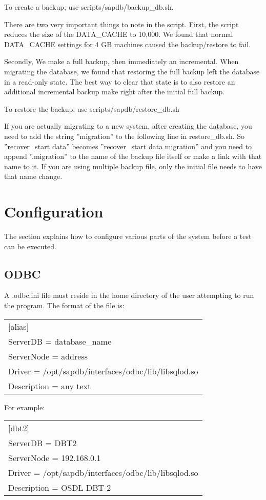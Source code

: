 \documentclass{article}
\begin{document}
To create a backup, use scripts/sapdb/backup\_db.sh.

There are two very important things to note in the script.  First, the script
reduces the size of the DATA\_CACHE to 10,000.   We found that normal
DATA\_CACHE settings for 4 GB machines caused the backup/restore to fail.

Secondly, We make a full backup, then immediately an incremental.  When
migrating the database, we found that restoring the full backup left the
database in a read-only state.  The best way to clear that state is to also
restore an additional incremental backup make right after the initial full
backup.

To restore the backup, use scripts/sapdb/restore\_db.sh

If you are actually migrating to a new system, after creating the database,
you need to add the string ''migration'' to the following line in
restore\_db.sh.  So ''recover\_start data'' becomes
''recover\_start data migration'' and you need to append ''.migration'' to
the name of the backup file itself or make a link with that name to it.  If
you are using multiple backup file, only the initial file needs to have that
name change.

\section{Configuration}

The section explains how to configure various parts of the system before a
test can be executed.

\subsection{ODBC}

A .odbc.ini file must reside in the home directory of the user
attempting to run the program.  The format of the file is: \\
\begin{tabular}[c]{l}
[alias] \\
ServerDB = database\_name \\
ServerNode = address \\
Driver = /opt/sapdb/interfaces/odbc/lib/libsqlod.so \\
Description = any text \\
\end{tabular}

For example: \\
\begin{tabular}[c]{l}
[dbt2] \\
ServerDB = DBT2 \\
ServerNode = 192.168.0.1 \\
Driver = /opt/sapdb/interfaces/odbc/lib/libsqlod.so \\
Description = OSDL DBT-2 \\
\end{tabular}
\end{document}
